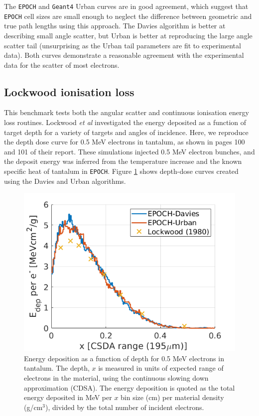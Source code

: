 \documentclass[12pt]{article}
\numberwithin{equation}{section}
\begin{document}
The \texttt{EPOCH} and \texttt{Geant4} Urban curves are in good agreement, which suggest that \texttt{EPOCH} cell sizes are small enough to neglect the difference between geometric and true path lengths using this approach. The Davies algorithm is better at describing small angle scatter, but Urban is better at reproducing the large angle scatter tail (unsurprising as the Urban tail parameters are fit to experimental data). Both curves demonstrate a reasonable agreement with the experimental data for the scatter of most electrons.

\subsection{Lockwood ionisation loss} \label{sec:bench:Lockwood}

This benchmark tests both the angular scatter and continuous ionisation energy loss routines. Lockwood \textit{et al} \cite{benchmark:Lockwood} investigated the energy deposited as a function of target depth for a variety of targets and angles of incidence. Here, we reproduce the depth dose curve for 0.5 MeV electrons in tantalum, as shown in pages 100 and 101 of their report. These simulations injected 0.5 MeV electron bunches, and the deposit energy was inferred from the temperature increase and the known specific heat of tantalum in \texttt{EPOCH}. Figure \ref{fig:bench:lockwood} shows depth-dose curves created using the Davies and Urban algorithms.

\begin{figure}
\centering
  \includegraphics[width=0.6\linewidth]{Figures/bench_Lockwood.png}
\caption{Energy deposition as a function of depth for 0.5 MeV electrons in tantalum. The depth, $x$ is measured in units of expected range of electrons in the material, using the continuous slowing down approximation (CDSA). The energy deposition is quoted as the total energy deposited in MeV per $x$ bin size (cm) per material density (g/$\text{cm}^3$), divided by the total number of incident electrons.}
\label{fig:bench:lockwood}
\end{figure}
\end{document}
